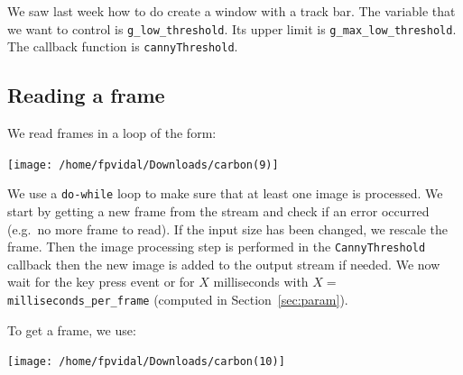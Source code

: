 \documentclass[english,a4paper,12pt,oneside]{article}
\begin{document}
We saw last week how to do create a window with a track bar. 
The variable that we want to control is \verb+g_low_threshold+. 
Its upper limit is \verb+g_max_low_threshold+. 
The callback function is \verb+cannyThreshold+.


\newpage
\subsection{Reading a frame}

We read frames in a loop of the form:


% 
% 
%         
%     
%     
%     
\texttt{[image: /home/fpvidal/Downloads/carbon(9)]}

We use a \verb+do-while+ loop to make sure that at least one image is processed. 
We start by getting a new frame from the stream and check if an error occurred (e.g.~no more frame to read). 
If the input size has been changed, we rescale the frame.
Then the image processing step is performed in the \verb+CannyThreshold+ callback then the new image is added to the output stream if needed. 
We now wait for the key press event or for $X$ milliseconds with $X=$\verb+milliseconds_per_frame+ (computed in Section~\ref{sec:param}).


To get a frame, we use:

\texttt{[image: /home/fpvidal/Downloads/carbon(10)]}
\end{document}
